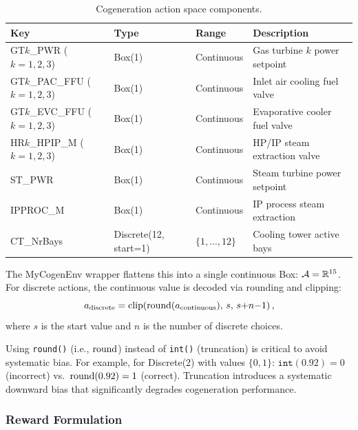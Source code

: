 \begin{table}[htbp]
\centering
\caption{Cogeneration action space components.}
\label{tab:cogen_actions}
\begin{tabular}{@{}llll@{}}
\toprule
\textbf{Key} & \textbf{Type} & \textbf{Range} & \textbf{Description} \\
\midrule
GT$k$\_PWR ($k\!=\!1,2,3$) & Box(1) & Continuous & Gas turbine $k$ power setpoint \\
GT$k$\_PAC\_FFU ($k\!=\!1,2,3$) & Box(1) & Continuous & Inlet air cooling fuel valve \\
GT$k$\_EVC\_FFU ($k\!=\!1,2,3$) & Box(1) & Continuous & Evaporative cooler fuel valve \\
HR$k$\_HPIP\_M ($k\!=\!1,2,3$) & Box(1) & Continuous & HP/IP steam extraction valve \\
ST\_PWR & Box(1) & Continuous & Steam turbine power setpoint \\
IPPROC\_M & Box(1) & Continuous & IP process steam extraction \\
CT\_NrBays & Discrete(12, start=1) & $\{1, \ldots, 12\}$ & Cooling tower active bays \\
\bottomrule
\end{tabular}
\end{table}

The MyCogenEnv wrapper flattens this into a single continuous Box: $\mathcal{A} = \mathbb{R}^{15}$. For discrete actions, the continuous value is decoded via rounding and clipping:
\begin{equation}
    a_{\text{discrete}} = \operatorname{clip}\!\left(\operatorname{round}(a_{\text{continuous}}), \, s, \, s{+}n{-}1\right),
    \label{eq:discrete_decode}
\end{equation}
where $s$ is the start value and $n$ is the number of discrete choices.

\begin{remark}
Using \texttt{round()} (i.e., $\operatorname{round}$) instead of \texttt{int()} (truncation) is critical to avoid systematic bias. For example, for Discrete(2) with values $\{0, 1\}$: $\texttt{int}(0.92) = 0$ (incorrect) vs.\ $\operatorname{round}(0.92) = 1$ (correct). Truncation introduces a systematic downward bias that significantly degrades cogeneration performance.
\end{remark}

\subsubsection{Reward Formulation}

